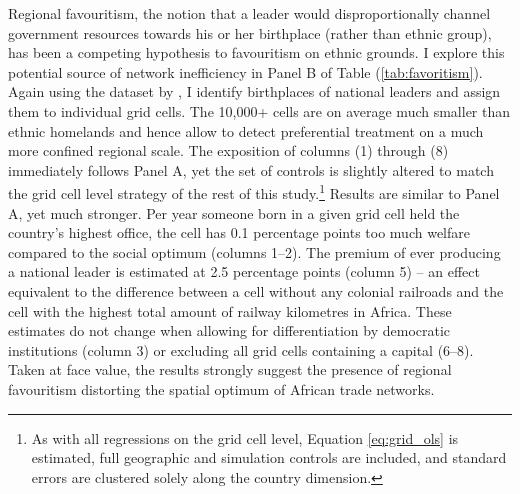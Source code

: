 \documentclass[11pt, oneside]{article}   	%
\let\oldref\ref
\renewcommand{\ref}[1]{(\oldref{#1})}
\begin{document}
Regional favouritism, the notion that a leader would disproportionally channel government resources towards his or her birthplace (rather than ethnic group), has been a competing hypothesis to favouritism on ethnic grounds. I explore this potential source of network inefficiency in Panel B of Table \ref{tab:favoritism}. Again using the dataset by \cite{Dreher_AiddemandAfrican_2016}, I identify birthplaces of national leaders and assign them to individual grid cells. The 10,000+ cells are on average much smaller than ethnic homelands and hence allow to detect preferential treatment on a much more confined regional scale. The exposition of columns (1) through (8) immediately follows Panel A, yet the set of controls is slightly altered to match the grid cell level strategy of the rest of this study.\footnote{As with all regressions on the grid cell level, Equation \eqref{eq:grid_ols} is estimated, full geographic and simulation controls are included, and standard errors are clustered solely along the country dimension.} Results are similar to Panel A, yet much stronger. Per year someone born in a given grid cell held the country's highest office, the cell has 0.1 percentage points too much welfare compared to the social optimum (columns 1--2). The premium of ever producing a national leader is estimated at 2.5 percentage points (column 5) -- an effect equivalent to the difference between a cell without any colonial railroads and the cell with the highest total amount of railway kilometres in Africa. These estimates do not change when allowing for differentiation by democratic institutions (column 3) or excluding all grid cells containing a capital (6--8). Taken at face value, the results strongly suggest the presence of regional favouritism distorting the spatial optimum of African trade networks.
\end{document}
